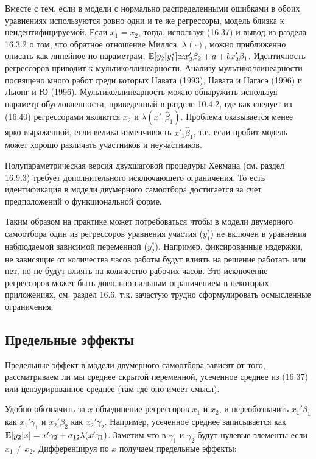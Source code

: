 Вместе с тем, если в модели с нормально распределенными ошибками в обоих уравнениях используются ровно одни и те же регрессоры, модель близка к  неидентифицируемой. Если $x_1=x_2$, тогда, используя (16.37) и вывод из раздела 16.3.2 о том, что обратное отношение Миллса, $\lambda(\cdot )$, можно приближенно описать как линейное по параметрам, $\mathbb{E}[y_2|y_1^{*}]{\simeq}x_2'\beta_2+a+bx_2'\beta_1$. Идентичность регрессоров приводит к мультиколлинеарности. Анализу мультиколлинеарности посвящено много работ среди которых Навата (1993), Навата и Нагасэ (1996) и Льюнг и Ю (1996). Мультиколлинеарность можно обнаружить используя параметр обусловленности, приведенный в разделе 10.4.2, где как следует из (16.40) регрессорами являются $x_2$ и $\lambda(x'_1\hat{\beta}_1)$. Проблема оказывается менее ярко выраженной, если велика изменчивость $x'_1\hat{\beta}_1$, т.е. если пробит-модель может хорошо различать участников и неучастников.

Полупараметрическая версия двухшаговой процедуры Хекмана (см. раздел 16.9.3) требует дополнительного исключающего ограничения. То есть идентификация в модели двумерного самоотбора достигается за счет предположений о функциональной форме.

Таким образом на практике может потребоваться чтобы в модели двумерного самоотбора один из регрессоров уравнения участия ($y_1^*$) не включен в уравнения наблюдаемой зависимой переменной ($y_2^*$). Например, фиксированные издержки, не зависящие от количества часов работы будут влиять на решение работать или нет, но не будут влиять на количество рабочих часов. Это исключение регрессоров может быть довольно сильным ограничением в некоторых приложениях, см. раздел 16.6, т.к. зачастую трудно сформулировать осмысленные ограничения.

\subsection{Предельные эффекты}

Предельные эффект в модели двумерного самоотбора зависят от того, рассматриваем ли мы среднее скрытой переменной, усеченное среднее из (16.37) или цензурированное среднее (там где оно имеет смысл).

Удобно обозначить за $x$ объединение регрессоров $x_1$ и $x_2$, и переобозначить $x_1'\beta_1$ как $x_1'\gamma_1$ и $x_2'\beta_2$ как $x_2'\gamma_2$. Например, усеченное среднее записывается как $\mathbb{E}[y_2|x]=x'\gamma_2+\sigma_{12}\lambda(x'\gamma_1)$. Заметим что в $\gamma_1$ и $\gamma_2$ будут нулевые элементы если $x_1\neq x_2$. Дифференцируя по $x$  получаем предельные эффекты:


